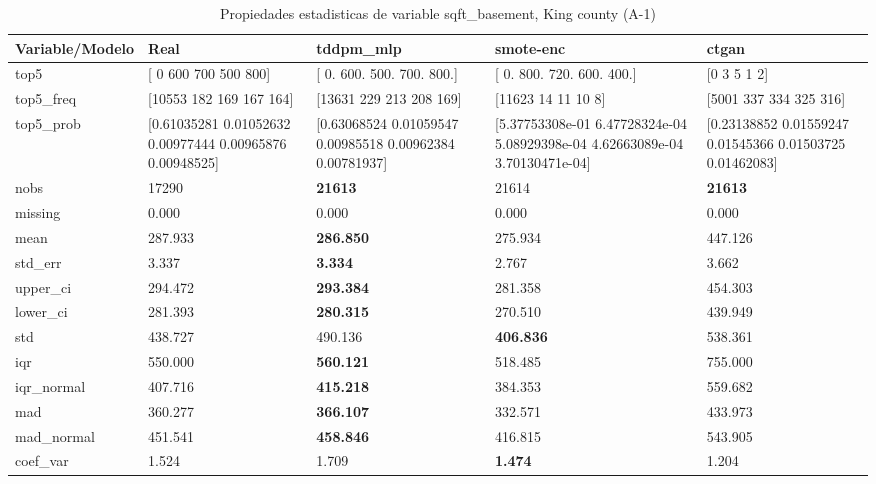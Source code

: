 \begin{table}[H]
\centering
\fontsize{8}{14}\selectfont
\caption{Propiedades  estadisticas de variable sqft\_basement, King county (A-1)}
\label{table-stats-king county-a-1-sqft_basement}
\begin{tabular}{|l|m{10em}|m{10em}|m{10em}|m{10em}|}
\hline
 \rowcolor[gray]{0.8}
Variable/Modelo & Real & tddpm\_mlp & smote-enc & ctgan \\
\hline top5 & [  0 600 700 500 800] & [  0. 600. 500. 700. 800.] & [  0. 800. 720. 600. 400.] & [0 3 5 1 2] \\
\hline top5\_freq & [10553   182   169   167   164] & [13631   229   213   208   169] & [11623    14    11    10     8] & [5001  337  334  325  316] \\
\hline top5\_prob & [0.61035281 0.01052632 0.00977444 0.00965876 0.00948525] & [0.63068524 0.01059547 0.00985518 0.00962384 0.00781937] & [5.37753308e-01 6.47728324e-04 5.08929398e-04 4.62663089e-04
 3.70130471e-04] & [0.23138852 0.01559247 0.01545366 0.01503725 0.01462083] \\
\hline nobs & 17290 & \bfseries 21613 & \cellcolor[rgb]{0.9, 0.54, 0.52} 21614 & \bfseries 21613 \\
\hline missing & 0.000 & 0.000 & 0.000 & 0.000 \\
\hline mean & 287.933 & \bfseries 286.850 & 275.934 & \cellcolor[rgb]{0.9, 0.54, 0.52} 447.126 \\
\hline std\_err & 3.337 & \bfseries 3.334 & \cellcolor[rgb]{0.9, 0.54, 0.52} 2.767 & 3.662 \\
\hline upper\_ci & 294.472 & \bfseries 293.384 & 281.358 & \cellcolor[rgb]{0.9, 0.54, 0.52} 454.303 \\
\hline lower\_ci & 281.393 & \bfseries 280.315 & 270.510 & \cellcolor[rgb]{0.9, 0.54, 0.52} 439.949 \\
\hline std & 438.727 & 490.136 & \bfseries 406.836 & \cellcolor[rgb]{0.9, 0.54, 0.52} 538.361 \\
\hline iqr & 550.000 & \bfseries 560.121 & 518.485 & \cellcolor[rgb]{0.9, 0.54, 0.52} 755.000 \\
\hline iqr\_normal & 407.716 & \bfseries 415.218 & 384.353 & \cellcolor[rgb]{0.9, 0.54, 0.52} 559.682 \\
\hline mad & 360.277 & \bfseries 366.107 & 332.571 & \cellcolor[rgb]{0.9, 0.54, 0.52} 433.973 \\
\hline mad\_normal & 451.541 & \bfseries 458.846 & 416.815 & \cellcolor[rgb]{0.9, 0.54, 0.52} 543.905 \\
\hline coef\_var & 1.524 & 1.709 & \bfseries 1.474 & \cellcolor[rgb]{0.9, 0.54, 0.52} 1.204 \\

\end{tabular}
\end{table}
